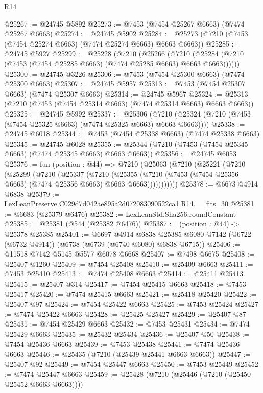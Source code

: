 \begin{lexlean}{R14}
\begin{coremodule}
@25267 := @24745 @5892
@25273 := @7453 (@7454 @25267 @6663) (@7474 @25267 @6663)
@25274 := @24745 @5902
@25284 := @25273 (@7210 (@7453 (@7454 @25274 @6663) (@7474 @25274 @6663) @6663 @6663))
@25285 := @24745 @5927
@25299 := @25228
    (@7210
      (@25266
        (@7210 (@25284 (@7210 (@7453 (@7454 @25285 @6663) (@7474 @25285 @6663) @6663 @6663))))))
@25300 := @24745 @3226
@25306 := @7453 (@7454 @25300 @6663) (@7474 @25300 @6663)
@25307 := @24745 @5957
@25313 := @7453 (@7454 @25307 @6663) (@7474 @25307 @6663)
@25314 := @24745 @5967
@25324 := @25313 (@7210 (@7453 (@7454 @25314 @6663) (@7474 @25314 @6663) @6663 @6663))
@25325 := @24745 @5992
@25337 := @25306
    (@7210 (@25324 (@7210 (@7453 (@7454 @25325 @6663) (@7474 @25325 @6663) @6663 @6663))))
@25338 := @24745 @6018
@25344 := @7453 (@7454 @25338 @6663) (@7474 @25338 @6663)
@25345 := @24745 @6028
@25355 := @25344 (@7210 (@7453 (@7454 @25345 @6663) (@7474 @25345 @6663) @6663 @6663))
@25356 := @24745 @6053
@25376 := fun (position : @44) =>
  @7210
    (@25063
      (@7210
        (@25221
          (@7210
            (@25299
              (@7210
                (@25337
                  (@7210
                    (@25355
                      (@7210 (@7453 (@7454 @25356 @6663) (@7474 @25356 @6663) @6663 @6663)))))))))))
@25378 := @6673 @4914 @6838
@25379 := LexLeanPreserve.C029d7d042ae895a2d072083090522ca1.R14.__fits_30
@25381 := @6683 (@25379 @6476)
@25382 := LexLeanStd.Sha256.roundConstant
@25385 := @25381 (@544 (@25382 @6476))
@25387 := (position : @44) -> @25378 @25385
@25401 := @6697
    @4914
    @6838
    @25385
    @6080
    @7142
    (@6722 (@6732 @4914))
    (@6738 (@6739 (@6740 @6080) @6838 @6715))
@25406 := @11518 @7142 @5145 @5577 @6078 @6668
@25407 := @7498 @6675
@25408 := @25407 @1260
@25409 := @7454 @25408
@25410 := @25409 @6663
@25411 := @7453 @25410
@25413 := @7474 @25408 @6663
@25414 := @25411 @25413
@25415 := @25407 @314
@25417 := @7454 @25415 @6663
@25418 := @7453 @25417
@25420 := @7474 @25415 @6663
@25421 := @25418 @25420
@25422 := @25407 @97
@25424 := @7454 @25422 @6663
@25425 := @7453 @25424
@25427 := @7474 @25422 @6663
@25428 := @25425 @25427
@25429 := @25407 @87
@25431 := @7454 @25429 @6663
@25432 := @7453 @25431
@25434 := @7474 @25429 @6663
@25435 := @25432 @25434
@25436 := @25407 @50
@25438 := @7454 @25436 @6663
@25439 := @7453 @25438
@25441 := @7474 @25436 @6663
@25446 := @25435 (@7210 (@25439 @25441 @6663 @6663))
@25447 := @25407 @92
@25449 := @7454 @25447 @6663
@25450 := @7453 @25449
@25452 := @7474 @25447 @6663
@25459 := @25428 (@7210 (@25446 (@7210 (@25450 @25452 @6663 @6663))))

\end{coremodule}
\end{lexlean}
